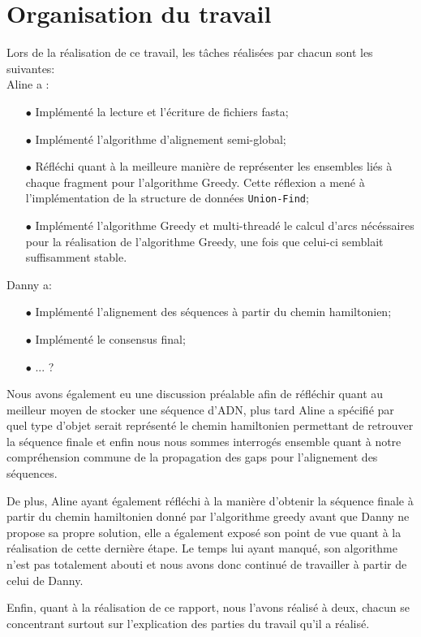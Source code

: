 \section{Organisation du travail}

Lors de la réalisation de ce travail, les tâches réalisées par chacun sont les suivantes:\\
Aline a :
\begin{itemize}
	\item[$\bullet$]Implémenté la lecture et l'écriture de fichiers fasta;
	\item[$\bullet$]Implémenté l'algorithme d'alignement semi-global;
	\item[$\bullet$]Réfléchi quant à la meilleure manière de représenter les ensembles liés à chaque fragment pour l'algorithme Greedy.
	 Cette réflexion a mené à l'implémentation de la structure de données \verb|Union-Find|;
	\item[$\bullet$]Implémenté l'algorithme Greedy et multi-threadé le calcul d'arcs nécéssaires pour la réalisation de l'algorithme Greedy, une fois que celui-ci semblait suffisamment stable.
\end{itemize}
$ $\\
Danny a:
\begin{itemize}
	\item[$\bullet$] Implémenté l'alignement des séquences à partir du chemin hamiltonien;
	\item[$\bullet$] Implémenté le consensus final;
	\item[$\bullet$]... ? 
\end{itemize}

Nous avons également eu une discussion préalable afin de réfléchir quant au meilleur moyen de stocker une séquence d'ADN, plus tard Aline a spécifié par quel type d'objet serait représenté le chemin hamiltonien permettant de retrouver la séquence finale et enfin nous nous sommes interrogés ensemble quant à notre compréhension commune de la propagation des gaps pour l'alignement des séquences.

De plus, Aline ayant également réfléchi à la manière d'obtenir la séquence finale à partir du chemin hamiltonien donné par l'algorithme greedy avant que Danny ne propose sa propre solution, elle a également exposé son point de vue quant à la réalisation de cette dernière étape. Le temps lui ayant manqué, son algorithme n'est pas totalement abouti et nous avons donc continué de travailler à partir de celui de Danny.

Enfin, quant à la réalisation de ce rapport, nous l'avons réalisé à deux, chacun se concentrant surtout sur l'explication des parties du travail qu'il a réalisé.
